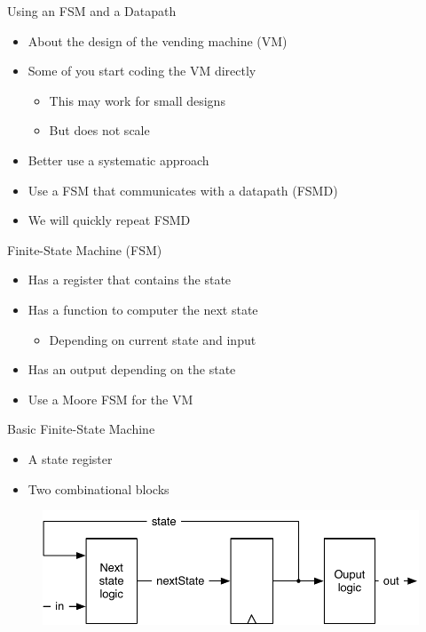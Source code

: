 \begin{frame}[fragile]{Using an FSM and a Datapath}
\begin{itemize}
\item About the design of the vending machine (VM)
\item Some of you start coding the VM directly
\begin{itemize}
\item This may work for small designs
\item But does not scale
\end{itemize}
\item Better use a systematic approach
\item Use a FSM that communicates with a datapath (FSMD)
\item We will quickly repeat FSMD
\end{itemize}
\end{frame}



\begin{frame}[fragile]{Finite-State Machine (FSM)}
\begin{itemize}
\item Has a register that contains the state
\item Has a function to computer the next state
\begin{itemize}
\item Depending on current state and input
\end{itemize}
\item Has an output depending on the state
\item Use a Moore FSM for the VM
\end{itemize}
\end{frame}

\begin{frame}[fragile]{Basic Finite-State Machine}
\begin{itemize}
\item A state register
\item Two combinational blocks
\end{itemize}
\begin{figure}
  \includegraphics[scale=\scale]{../figures/fsm}
\end{figure}
\end{frame}

